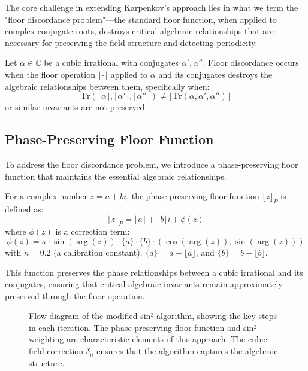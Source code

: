 The core challenge in extending Karpenkov's approach lies in what we term the "floor discordance problem"—the standard floor function, when applied to complex conjugate roots, destroys critical algebraic relationships that are necessary for preserving the field structure and detecting periodicity.

\begin{definition}
Let $\alpha \in \mathbb{C}$ be a cubic irrational with conjugates $\alpha', \alpha''$. Floor discordance occurs when the floor operation $\lfloor\cdot\rfloor$ applied to $\alpha$ and its conjugates destroys the algebraic relationships between them, specifically when:
\begin{equation}
\text{Tr}(\lfloor\alpha\rfloor, \lfloor\alpha'\rfloor, \lfloor\alpha''\rfloor) \neq \lfloor\text{Tr}(\alpha, \alpha', \alpha'')\rfloor
\end{equation}
or similar invariants are not preserved.
\end{definition}

\subsection{Phase-Preserving Floor Function}

To address the floor discordance problem, we introduce a phase-preserving floor function that maintains the essential algebraic relationships.

\begin{definition}
For a complex number $z = a + bi$, the phase-preserving floor function $\lfloor z \rfloor_P$ is defined as:
\begin{equation}
\lfloor z \rfloor_P = \lfloor a \rfloor + \lfloor b \rfloor i + \phi(z)
\end{equation}
where $\phi(z)$ is a correction term:
\begin{equation}
\phi(z) = \kappa \cdot \sin(\arg(z)) \cdot \{a\} \cdot \{b\} \cdot (\cos(\arg(z)), \sin(\arg(z)))
\end{equation}
with $\kappa = 0.2$ (a calibration constant), $\{a\} = a - \lfloor a \rfloor$, and $\{b\} = b - \lfloor b \rfloor$.
\end{definition}

This function preserves the phase relationships between a cubic irrational and its conjugates, ensuring that critical algebraic invariants remain approximately preserved through the floor operation.

\begin{figure}[ht]
\centering
\caption{Flow diagram of the modified sin²-algorithm, showing the key steps in each iteration. The phase-preserving floor function and sin²-weighting are characteristic elements of this approach. The cubic field correction $\delta_n$ ensures that the algorithm captures the algebraic structure.}
\label{fig:sin2_algorithm}
\end{figure}

